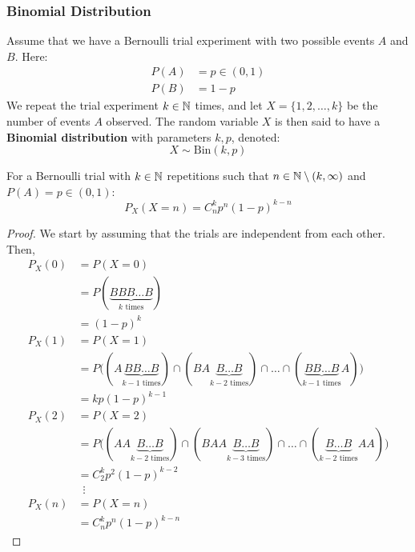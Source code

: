 \documentclass{article}
\begin{document}
	\subsubsection{Binomial Distribution}
		Assume that we have a Bernoulli trial experiment with two possible events $A$ and $B$. Here:
		\begin{align*}
			P(A) &= p \in (0,1) \\
			P(B) &= 1-p
		\end{align*}
		We repeat the trial experiment $k\in \mathbb{N}$ times, and let $X = \{1, 2, \dots, k\}$ be the number of events $A$ observed. The random variable $X$ is then said to have a \textbf{Binomial distribution} with parameters $k, p$, denoted:
		$$ X \sim \text{Bin}(k, p)$$
		\begin{prop}
			For a Bernoulli trial with $k\in \mathbb{N}$ repetitions such that $n \in \mathbb{N} \setminus (k, \infty)$ and \\$P(A) = p \in (0,1)$:
			$$ P_X(X=n) = C_n^k p^n (1-p)^{k-n}$$
		\end{prop}
		\begin{proof}
			We start by assuming that the trials are independent from each other. Then,
			\begin{align*}
				P_X(0) &= P(X=0)  \\
				&= P(\underbrace{B B B \dots B}_{k \text{ times}})  \\
				&= (1-p)^k \\
				P_X(1) &= P(X=1) \\
				&= P\big( (A\underbrace{BB\dots B}_{k-1 \text{ times}})  \cap (BA\underbrace{B\dots B}_{k-2 \text{ times}}) \cap \dots \cap (\underbrace{BB\dots B}_{k-1 \text{ times}}A)\big) \\
				&= k p (1-p)^{k-1} \\
				P_X(2) &= P(X=2) \\
				&= P\big( (AA\underbrace{B\dots B}_{k-2 \text{ times}})  \cap (BAA\underbrace{B\dots B}_{k-3 \text{ times}}) \cap \dots \cap (\underbrace{B\dots B}_{k-2 \text{ times}}AA)\big) \\
				&= C_2^k p^2 (1-p)^{k-2}\\
				&\,\, \, \vdots\\
				P_X(n) &= P(X=n)  \\
				&= C_n^k p^n (1-p)^{k-n}
 			\end{align*}
		\end{proof}
\end{document}
